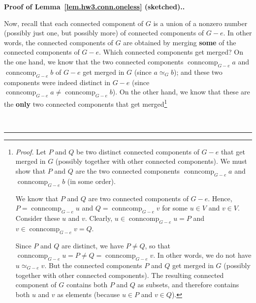 \documentclass[numbers=enddot,12pt,final,onecolumn,notitlepage]{scrartcl}%
\theoremstyle{definition}
\newenvironment{proof}[1][Proof]{\noindent\textbf{#1.} }{\ \rule{0.5em}{0.5em}}
\newcommand{\conncomp}{\operatorname{conncomp}}
\newcommand{\set}[1]{\left\{ #1 \right\}}
\newcommand{\tup}[1]{\left( #1 \right)}
\begin{document}
\begin{proof}[Proof of Lemma~\ref{lem.hw3.conn.oneless} (sketched).]
\begin{itemize}
      \par
      Now, recall that each connected component of $G$ is a union
      of a nonzero number (possibly just one, but possibly more) of
      connected components of $G - e$.
      In other words, the connected components of $G$ are obtained
      by merging \textbf{some} of the connected components of
      $G - e$.
      Which connected components get merged?
      On the one hand, we know that the two connected components
      $\conncomp_{G - e} a$ and $\conncomp_{G - e} b$ of $G - e$
      get merged in $G$ (since $a \simeq_G b$); and these two
      components were indeed distinct in $G - e$ (since
      $\conncomp_{G - e} a \neq \conncomp_{G - e} b$).
      On the other hand, we know that these are the \textbf{only}
      two connected components that get
      merged\footnote{\textit{Proof.} Let $P$ and $Q$ be two
        distinct connected components of $G - e$ that get merged in
        $G$ (possibly together with other connected components).
        We must show that $P$ and $Q$ are the two connected components
        $\conncomp_{G - e} a$ and $\conncomp_{G - e} b$ (in some
        order).
        \par We know that $P$ and $Q$ are two connected components
        of $G - e$.
        Hence, $P = \conncomp_{G - e} u$ and
        $Q = \conncomp_{G - e} v$ for some $u \in V$ and $v \in V$.
        Consider these $u$ and $v$.
        Clearly, $u \in \conncomp_{G - e} u = P$ and
        $v \in \conncomp_{G - e} v = Q$. \par
        Since $P$ and $Q$ are distinct, we have $P \neq Q$, so that
        $\conncomp_{G - e} u = P \neq Q = \conncomp_{G - e} v$.
        In other words, we do not have $u \simeq_{G - e} v$.
        But the connected components $P$ and $Q$ get merged in $G$
        (possibly together with other connected components). The
        resulting connected component of $G$ contains both $P$ and
        $Q$ as subsets, and therefore contains both $u$ and $v$ as
        elements (because $u \in P$ and $v \in Q$).
}
\end{itemize}
\end{proof}
\end{document}
